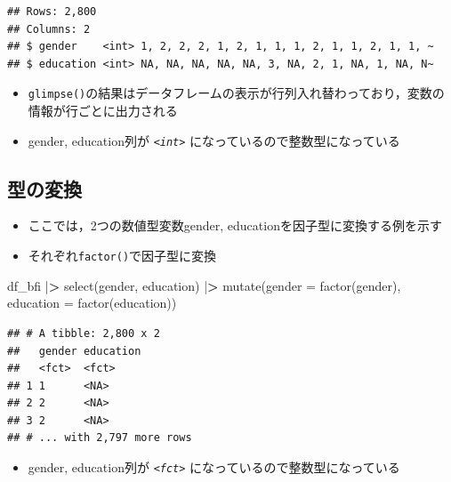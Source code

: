 \documentclass[
  xelatex,ja=standard, b5paper]{bxjsbook}
\newenvironment{Shaded}{\begin{snugshade}}{\end{snugshade}}
\newcommand{\AttributeTok}[1]{\textcolor[rgb]{0.77,0.63,0.00}{#1}}
\newcommand{\ErrorTok}[1]{\textcolor[rgb]{0.64,0.00,0.00}{\textbf{#1}}}
\newcommand{\FunctionTok}[1]{\textcolor[rgb]{0.00,0.00,0.00}{#1}}
\newcommand{\NormalTok}[1]{#1}
\newcommand{\SpecialCharTok}[1]{\textcolor[rgb]{0.00,0.00,0.00}{#1}}
\providecommand{\tightlist}{%
  \setlength{\itemsep}{0pt}\setlength{\parskip}{0pt}}
\begin{document}
\begin{verbatim}
## Rows: 2,800
## Columns: 2
## $ gender    <int> 1, 2, 2, 2, 1, 2, 1, 1, 1, 2, 1, 1, 2, 1, 1, ~
## $ education <int> NA, NA, NA, NA, NA, 3, NA, 2, 1, NA, 1, NA, N~
\end{verbatim}

\begin{itemize}
\tightlist
\item
  \texttt{glimpse()}の結果はデータフレームの表示が行列入れ替わっており，変数の情報が行ごとに出力される
\item
  gender, education列が \emph{\texttt{\textless{}int\textgreater{}}} になっているので整数型になっている
\end{itemize}

\hypertarget{mu-kata-trans}{%
\subsection{型の変換}\label{mu-kata-trans}}

\begin{itemize}
\tightlist
\item
  ここでは，2つの数値型変数gender, educationを因子型に変換する例を示す
\item
  それぞれ\texttt{factor()}で因子型に変換
\end{itemize}

\begin{Shaded}
\begin{Highlighting}[]
\NormalTok{df\_bfi }\SpecialCharTok{|}\ErrorTok{\textgreater{}}
  \FunctionTok{select}\NormalTok{(gender, education) }\SpecialCharTok{|}\ErrorTok{\textgreater{}} 
  \FunctionTok{mutate}\NormalTok{(}\AttributeTok{gender =} \FunctionTok{factor}\NormalTok{(gender),}
         \AttributeTok{education =} \FunctionTok{factor}\NormalTok{(education))}
\end{Highlighting}
\end{Shaded}

\begin{verbatim}
## # A tibble: 2,800 x 2
##   gender education
##   <fct>  <fct>    
## 1 1      <NA>     
## 2 2      <NA>     
## 3 2      <NA>     
## # ... with 2,797 more rows
\end{verbatim}

\begin{itemize}
\tightlist
\item
  gender, education列が \emph{\texttt{\textless{}fct\textgreater{}}} になっているので整数型になっている
\end{itemize}
\end{document}
